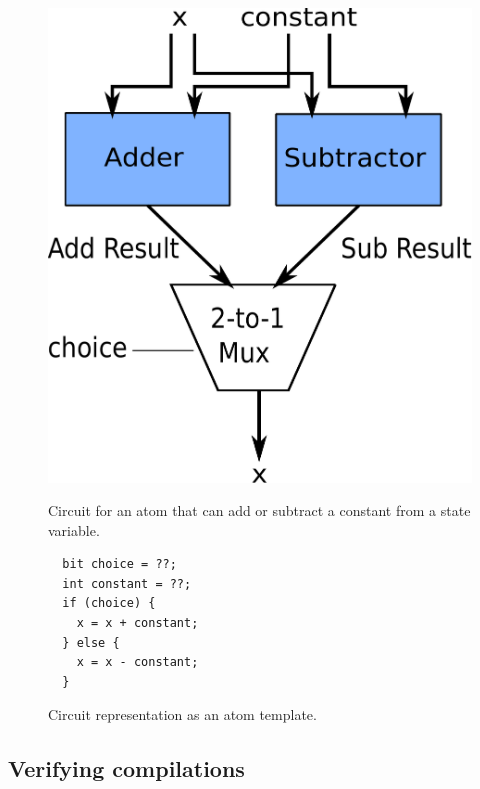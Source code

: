 \begin{figure}[h]
  \begin{minipage}{0.4\columnwidth}
  \begin{center}
  \includegraphics[width=\columnwidth]{circuit.pdf}
  \end{center}
  \caption{Circuit for an atom that can add or subtract a constant from a state variable.}
  \label{fig:alu_diag}
  \end{minipage}
  \hspace{0.05\columnwidth}
  \begin{minipage}{0.55\columnwidth}
  \begin{lstlisting}
  bit choice = ??;
  int constant = ??;
  if (choice) {
    x = x + constant;
  } else {
    x = x - constant;
  }
  \end{lstlisting}
  \caption{Circuit representation as an atom template.}
  \label{fig:alu_in_sketch}
  \end{minipage}
\end{figure}

\subsection{Verifying compilations}
\label{ss:verification}

